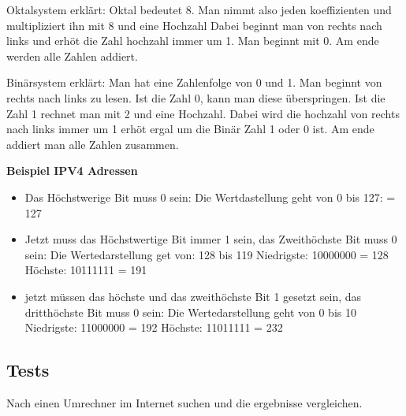 \documentclass[a4paper,11pt,titlepage]{article}
\begin{document}
Oktalsystem erklärt: \newline
Oktal bedeutet 8. \newline
Man nimmt also jeden koeffizienten und multipliziert ihn mit 8 und eine Hochzahl \newline
Dabei beginnt man von rechts nach links und erhöt die Zahl hochzahl immer um 1. Man beginnt mit 0. \newline
Am ende werden alle Zahlen addiert.\newline

Bin\"arsystem erklärt: \newline
Man hat eine Zahlenfolge von 0 und 1. Man beginnt von rechts nach links zu lesen. Ist die Zahl 0, \newline
kann man diese \"uberspringen. Ist die Zahl 1 rechnet man mit 2 und eine Hochzahl. Dabei wird die hochzahl von rechts nach links \newline
immer um 1 erh\"ot ergal um die Bin\"ar Zahl 1 oder 0 ist. Am ende addiert man alle Zahlen zusammen.





\textbf{Beispiel IPV4 Adressen} \newline
\begin{itemize}
	\item Das H\"ochstwerige Bit muss 0 sein: Die Wertdastellung geht von 0 bis 127: = 127\newline
	\item Jetzt muss das H\"ochstwertige Bit immer 1 sein, das Zweith\"ochste Bit muss 0 sein:\newline
	      Die Wertedarstellung get von: 128 bis 119 \newline
	      Niedrigste: 10000000 = 128 \newline
	      H\"ochste:  10111111 = 191 \newline
	\item jetzt m\"ussen das h\"ochste und das zweith\"ochste Bit 1 gesetzt sein, das dritth\"ochste \newline
	      Bit muss 0 sein: Die Wertedarstellung geht von 0 bis 10 \newline
	      Niedrigste: 11000000 = 192 \newline
	      H\"ochste:  11011111 = 232 \newline
\end{itemize}

\pagebreak

\subsection{Tests}
Nach einen Umrechner im Internet suchen und die ergebnisse vergleichen. \newline
\end{document}
